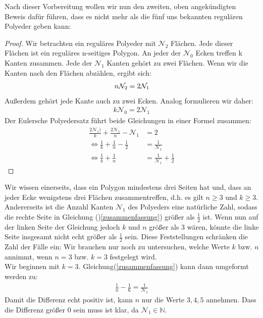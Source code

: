 Nach dieser Vorbereitung wollen wir nun den zweiten, oben angekündigten Beweis dafür führen, dass es nicht mehr als die fünf uns bekannten regulären Polyeder geben kann: 
\begin{proof}
Wir betrachten ein reguläres Polyeder mit $\mathcal{N}_2$ Flächen. Jede dieser Flächen ist ein reguläres n-seitiges Polygon. 
An jeder der $\mathcal{N}_0$ Ecken treffen k Kanten zusammen.
Jede der $\mathcal{N}_1$ Kanten gehört zu zwei Flächen. Wenn wir die Kanten nach den Flächen abzählen, ergibt sich:  
\begin{align}
\setcounter{equation}{0}
n\mathcal{N}_2= 2\mathcal{N}_1 \label{start1}
\end{align}
Außerdem gehört jede Kante auch zu zwei Ecken. Analog formulieren wir daher: 
\begin{align}
k\mathcal{N}_0=2\mathcal{N}_1 \label{start2}
\end{align}
Der Eulersche Polyedersatz führt beide Gleichungen in einer Formel zusammen: 
\begin{align}
\frac{2\mathcal{N}_1)}{k} + \frac{2\mathcal{N}_1}{n} - \mathcal{N}_1 &= 2 \\
\Leftrightarrow \frac{1}{k} + \frac{1}{n} - \frac{1}{2} &= \frac{1}{\mathcal{N}_1}\\
\Leftrightarrow \frac{1}{k} + \frac{1}{n}  &= \frac{1}{\mathcal{N}_1} + \frac{1}{2}\label{zusammenfassung}
\end{align}
\end{proof}
Wir wissen einerseits, dass ein Polygon mindestens drei Seiten hat und, dass an jeder Ecke wenigstens drei Flächen zusammentreffen, d.h. es gilt $n\geq 3$ und $k\geq 3$. Andererseits ist die Anzahl Kanten $\mathcal{N}_1$ des Polyeders eine natürliche Zahl, sodass die rechte Seite in Gleichung ()\ref{zusammenfassung}) größer als $\frac{1}{2}$ ist. Wenn nun auf der linken Seite der Gleichung jedoch $k$ und $n$ größer als 3 wären, könnte die linke Seite insgesamt nicht echt größer als $\frac{1}{2}$  sein. Diese Feststellungen schränken die Zahl der Fälle ein: Wir brauchen nur noch zu untersuchen, welche Werte $k$ bzw. $n$ annimmt, wenn $n=3$ bzw. $k=3$ festgelegt wird.\\
Wir beginnen mit $k=3$.
Gleichung(\ref{zusammenfassung}) kann dann umgeformt werden zu: 
\begin{align}
\frac{1}{n}- \frac{1}{6}= \frac{1}{\mathcal{N}_1} \label{kfix}
\end{align}
Damit die Differenz echt positiv ist, kann $n$ nur die Werte $3, 4, 5$ annehmen. Dass die Differenz größer 0 sein muss ist klar, da $\mathcal{N}_1 \in \mathbb{N}$. 
